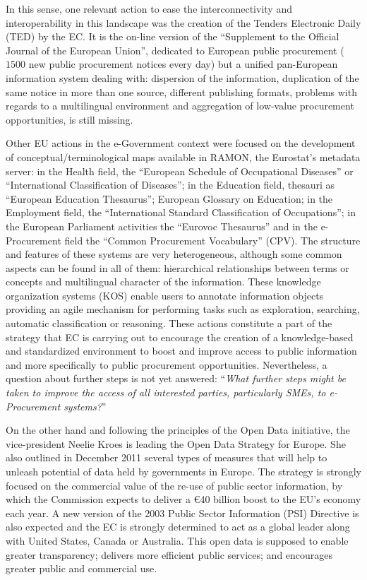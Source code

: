 \documentclass[preprint,12pt]{elsarticle}
\begin{document}
In this sense, one relevant action to ease the interconnectivity and interoperability in this landscape was the creation of the Tenders Electronic Daily (TED) 
by the EC. It is the on-line version of the ``Supplement to the Official Journal of the European Union'', dedicated to European public procurement 
($1500$ new public procurement notices every day) but a unified pan-European information system dealing with: dispersion of the information,
duplication of the same notice in more than one source, different publishing formats, problems with regards to a multilingual environment and 
aggregation of low-value procurement opportunities, is still missing. 


Other EU actions in the e-Government context were focused on the development of conceptual/terminological maps available in RAMON, the Eurostat's metadata server: 
in the Health field, the ``European Schedule of Occupational Diseases'' or ``International Classification of Diseases''; in the Education field,  
thesauri as ``European Education Thesaurus''; European Glossary on Education; in the Employment field, 
the ``International Standard Classification of Occupations'';  in the European Parliament activities the ``Eurovoc Thesaurus'' and in the 
e-Procurement field the ``Common Procurement Vocabulary'' (CPV). The structure and features of these systems are very heterogeneous, 
although some common aspects can be found in all of them: hierarchical relationships between terms or concepts and multilingual character of the information. 
These knowledge organization systems (KOS) enable users to annotate information objects providing an agile mechanism for performing 
tasks such as exploration, searching, automatic classification or reasoning. These actions constitute a part of the strategy that EC 
is carrying out to encourage the creation of a knowledge-based and standardized environment to boost and improve access to 
public information and more specifically to public procurement opportunities. Nevertheless, a question about further steps is not yet answered: ``\textit{What further steps might be 
taken to improve the access of all interested parties, particularly SMEs, to e-Procurement systems?}''

On the other hand and following the principles of the Open Data initiative, the vice-president Neelie Kroes is leading the Open Data Strategy for Europe. 
She also outlined in December 2011 several types of measures that will help to unleash potential of data held by governments in Europe. The strategy is 
strongly focused on the commercial value of the re-use of public sector information, by which the Commission expects to deliver a \euro 40 billion boost to the EU's economy each year. 
A new version of the 2003 Public Sector Information (PSI) Directive is also expected and the EC is strongly determined to act as a global leader along with United States, 
Canada or Australia. This open data is supposed to enable greater transparency; delivers more efficient public services; and encourages greater public and commercial use.
\end{document}
